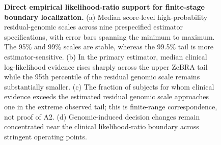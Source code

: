 {\begin{figure}[!t]
\caption{\textbf{Direct empirical likelihood-ratio support for finite-stage boundary localization.} (a) Median score-level high-probability residual-genomic scales across nine prespecified estimator specifications, with error bars spanning the minimum to maximum. The 95\% and 99\% scales are stable, whereas the 99.5\% tail is more estimator-sensitive. (b) In the primary estimator, median clinical log-likelihood evidence rises sharply across the upper ZeBRA tail while the 95th percentile of the residual genomic scale remains substantially smaller. (c) The fraction of subjects for whom clinical evidence exceeds the estimated residual genomic scale approaches one in the extreme observed tail; this is finite-range correspondence, not proof of A2. (d) Genomic-induced decision changes remain concentrated near the clinical likelihood-ratio boundary across stringent operating points.}
\label{fig:empirical-lr-robustness}
\label{fig:lr-robustness}
\end{figure}%
}
